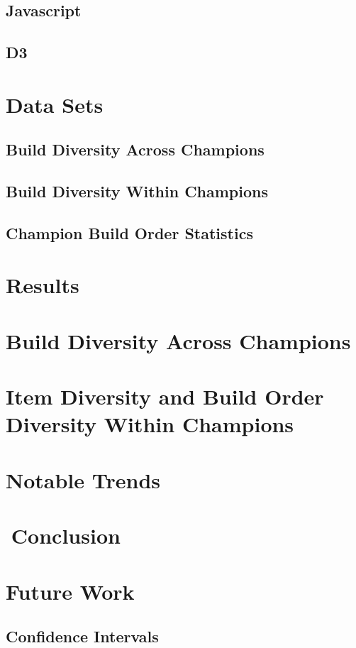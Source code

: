 \documentclass[11pt]{amsart}
\begin{document}
\subsection{Javascript}



\subsection{D3}


\section{Data Sets}
\subsection{Build Diversity Across Champions}

\subsection{Build Diversity Within Champions}
\subsection{Champion Build Order Statistics}



\section{Results}
\section{Build Diversity Across Champions}
\section{Item Diversity and Build Order Diversity Within Champions}
\section{Notable Trends}

\section{Conclusion}


\section{Future Work}
\subsection{Confidence Intervals}
\end{document}
